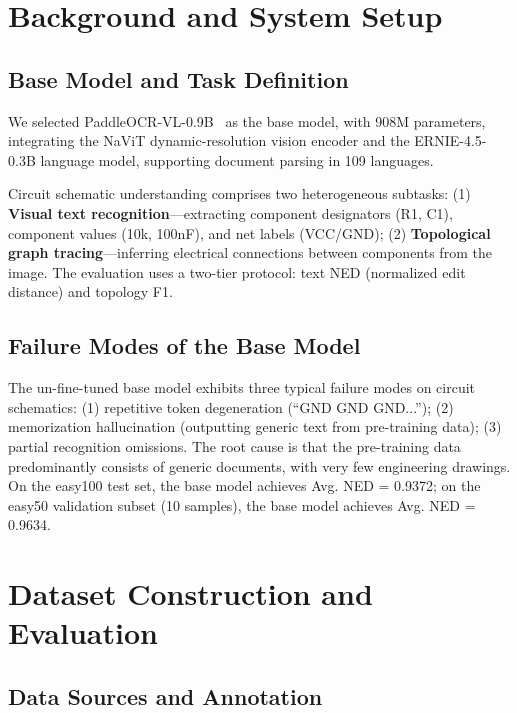 \section{Background and System Setup}

\subsection{Base Model and Task Definition}

We selected PaddleOCR-VL-0.9B~\citep{cui2025paddleocrvl} as the base model, with 908M parameters, integrating the NaViT dynamic-resolution vision encoder and the ERNIE-4.5-0.3B language model, supporting document parsing in 109 languages.

Circuit schematic understanding comprises two heterogeneous subtasks: (1) \textbf{Visual text recognition}---extracting component designators (R1, C1), component values (10k, 100nF), and net labels (VCC/GND); (2) \textbf{Topological graph tracing}---inferring electrical connections between components from the image. The evaluation uses a two-tier protocol: text NED (normalized edit distance) and topology F1.

\subsection{Failure Modes of the Base Model}

The un-fine-tuned base model exhibits three typical failure modes on circuit schematics: (1) repetitive token degeneration (``GND GND GND...''); (2) memorization hallucination (outputting generic text from pre-training data); (3) partial recognition omissions. The root cause is that the pre-training data predominantly consists of generic documents, with very few engineering drawings. On the easy100 test set, the base model achieves Avg. NED = 0.9372; on the easy50 validation subset (10 samples), the base model achieves Avg. NED = 0.9634.

\begin{figure}[h]
\centering
\end{figure}


\section{Dataset Construction and Evaluation}

\subsection{Data Sources and Annotation}

